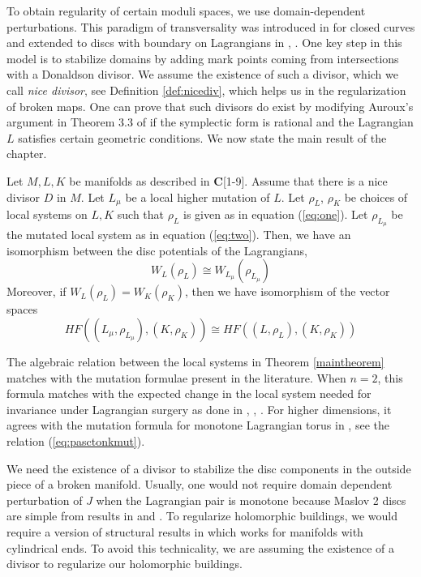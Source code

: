  To obtain regularity of certain moduli spaces,  we use domain-dependent perturbations.  This paradigm of transversality was introduced in \cite{CMtrans} for closed curves and extended to discs with boundary on Lagrangians in \cite{charwoodstabil}, \cite{floerflip}.  One key step in this model is to stabilize domains by adding mark points coming from intersections with a Donaldson divisor.  We assume the existence of such a divisor, which we call \textit{nice divisor},  see Definition \ref{def:nicediv}, which helps us in the regularization of broken maps. One can prove that such divisors do exist by modifying Auroux's argument in Theorem 3.3 of \cite{wall} if the symplectic form is rational and the Lagrangian $L$ satisfies certain geometric conditions.  We now state the main result of the chapter. 



\begin{Theorem}\label{maintheorem}
Let $M,L,K$ be manifolds as described in \textbf{C}[1-9]. Assume that there is a nice divisor $D$ in $M$. Let $L_\mu$ be a local higher mutation of $L$. Let $\rho_L$, $\rho_K$ be choices of local systems on $L, K$ such that $\rho_L$ is given as in equation (\ref{eq:one}). Let $\rho_{L_\mu}$ be the mutated local system as in equation (\ref{eq:two}).  Then,  we have an isomorphism between the disc potentials of the Lagrangians,  $$W_L(\rho_L) \cong W_{L_\mu}(\rho_{L_\mu})$$
Moreover,  if $W_L(\rho_L)=W_K(\rho_K)$, then we have isomorphism of the vector spaces
$$HF((L_\mu, \rho_{L_\mu}), (K, \rho_K)) \cong HF((L, \rho_L), (K, \rho_K))$$
\end{Theorem}



\begin{remark}
The algebraic relation between the local systems in Theorem \ref{maintheorem} matches with the mutation formulae present in the literature.  When $n=2$, this formula matches with the expected change in the local system needed for invariance under Lagrangian surgery as done in \cite{aurTdual}, \cite{seidelLC}, \cite{palmerwoodwardsurg}. For higher dimensions, it agrees with the mutation formula for monotone Lagrangian torus in \cite{wall},  see the relation (\ref{eq:pasctonkmut}). 
\end{remark}

\begin{remark} We need the existence of a divisor to stabilize the disc components in the outside piece of a broken manifold. Usually, one would not require domain dependent perturbation of $J$ when the Lagrangian pair is monotone because Maslov 2 discs are simple from results in \cite{kwonoh:sturc} and \cite{lazz:frame}. To regularize holomorphic buildings, we would require a version of structural results in \cites{lazz:frame,kwonoh:sturc} which works for manifolds with cylindrical ends. To avoid this technicality, we are assuming the existence of a divisor to regularize our holomorphic buildings.
    
\end{remark}


